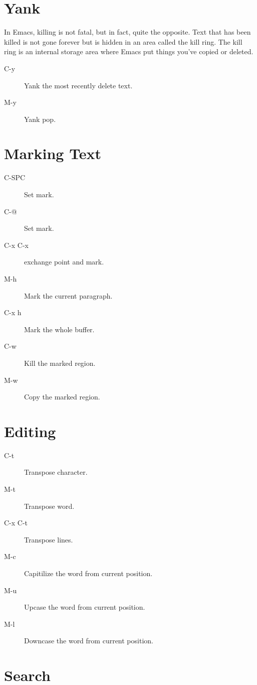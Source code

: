 \section{Yank}

In Emacs, killing is not fatal, but in fact, quite the opposite.
Text that has been killed is not gone forever but is hidden in an area called the kill ring.
The kill ring is an internal storage area where Emacs put things you've copied or deleted. 


\begin{description}
\item[C-y] Yank the most recently delete text.
\item[M-y] Yank pop.
\end{description}

\section{Marking Text}
\begin{description}
\item[C-SPC] Set mark.
\item[C-@] Set mark.
\item[C-x C-x] exchange point and mark.
\item[M-h] Mark the current paragraph.
\item[C-x h] Mark the whole buffer.
\item[C-w] Kill the marked region.
\item[M-w] Copy the marked region.
\end{description}


\section{Editing}

\begin{description}
\item[C-t] Transpose character.
\item[M-t] Transpose word.
\item[C-x C-t] Transpose lines.
\item[M-c] Capitilize the word from current position.
\item[M-u] Upcase the word from current position.
\item[M-l] Downcase the word from current position.
\end{description}


\section{Search}

